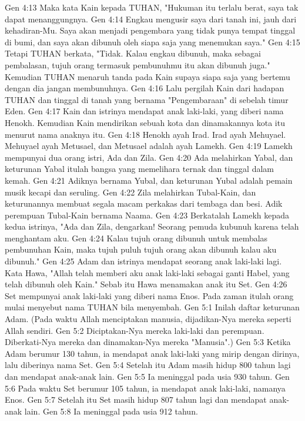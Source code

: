 Gen 4:13  Maka kata Kain kepada TUHAN, "Hukuman itu terlalu berat, saya tak dapat menanggungnya.
Gen 4:14  Engkau mengusir saya dari tanah ini, jauh dari kehadiran-Mu. Saya akan menjadi pengembara yang tidak punya tempat tinggal di bumi, dan saya akan dibunuh oleh siapa saja yang menemukan saya."
Gen 4:15  Tetapi TUHAN berkata, "Tidak. Kalau engkau dibunuh, maka sebagai pembalasan, tujuh orang termasuk pembunuhmu itu akan dibunuh juga." Kemudian TUHAN menaruh tanda pada Kain supaya siapa saja yang bertemu dengan dia jangan membunuhnya.
Gen 4:16  Lalu pergilah Kain dari hadapan TUHAN dan tinggal di tanah yang bernama "Pengembaraan" di sebelah timur Eden.
Gen 4:17  Kain dan istrinya mendapat anak laki-laki, yang diberi nama Henokh. Kemudian Kain mendirikan sebuah kota dan dinamakannya kota itu menurut nama anaknya itu.
Gen 4:18  Henokh ayah Irad. Irad ayah Mehuyael. Mehuyael ayah Metusael, dan Metusael adalah ayah Lamekh.
Gen 4:19  Lamekh mempunyai dua orang istri, Ada dan Zila.
Gen 4:20  Ada melahirkan Yabal, dan keturunan Yabal itulah bangsa yang memelihara ternak dan tinggal dalam kemah.
Gen 4:21  Adiknya bernama Yubal, dan keturunan Yubal adalah pemain musik kecapi dan seruling.
Gen 4:22  Zila melahirkan Tubal-Kain, dan keturunannya membuat segala macam perkakas dari tembaga dan besi. Adik perempuan Tubal-Kain bernama Naama.
Gen 4:23  Berkatalah Lamekh kepada kedua istrinya, "Ada dan Zila, dengarkan! Seorang pemuda kubunuh karena telah menghantam aku.
Gen 4:24  Kalau tujuh orang dibunuh untuk membalas pembunuhan Kain, maka tujuh puluh tujuh orang akan dibunuh kalau aku dibunuh."
Gen 4:25  Adam dan istrinya mendapat seorang anak laki-laki lagi. Kata Hawa, "Allah telah memberi aku anak laki-laki sebagai ganti Habel, yang telah dibunuh oleh Kain." Sebab itu Hawa menamakan anak itu Set.
Gen 4:26  Set mempunyai anak laki-laki yang diberi nama Enos. Pada zaman itulah orang mulai menyebut nama TUHAN bila menyembah.
Gen 5:1  Inilah daftar keturunan Adam. (Pada waktu Allah menciptakan manusia, dijadikan-Nya mereka seperti Allah sendiri.
Gen 5:2  Diciptakan-Nya mereka laki-laki dan perempuan. Diberkati-Nya mereka dan dinamakan-Nya mereka "Manusia".)
Gen 5:3  Ketika Adam berumur 130 tahun, ia mendapat anak laki-laki yang mirip dengan dirinya, lalu diberinya nama Set.
Gen 5:4  Setelah itu Adam masih hidup 800 tahun lagi dan mendapat anak-anak lain.
Gen 5:5  Ia meninggal pada usia 930 tahun.
Gen 5:6  Pada waktu Set berumur 105 tahun, ia mendapat anak laki-laki, namanya Enos.
Gen 5:7  Setelah itu Set masih hidup 807 tahun lagi dan mendapat anak-anak lain.
Gen 5:8  Ia meninggal pada usia 912 tahun.

